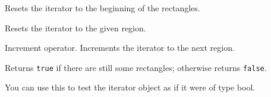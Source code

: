 \label{wxregioniteratorreset}


Resets the iterator to the beginning of the rectangles.


Resets the iterator to the given region.

\label{wxregioniteratorinc}


Increment operator. Increments the iterator to the next region.


\label{wxregioniteratorbool}


Returns {\tt true} if there are still some rectangles; otherwise returns {\tt false}.

You can use this to test the iterator object as if it were of type bool.

